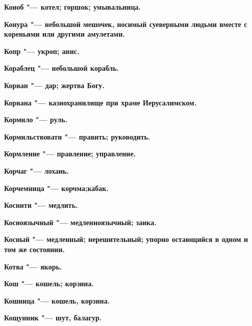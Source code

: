 \begin{multicols}{2}
\bfseries Коноб\normalfont{} "--- котел; горшок; умывальница. 




\bfseries Конура\normalfont{} "--- небольшой мешочек, носимый суеверными людьми вместе с кореньями или другими амулетами. 




\bfseries Копр\normalfont{} "--- укроп; анис. 




\bfseries Кораблец\normalfont{} "--- небольшой корабль. 




\bfseries Корван\normalfont{} "--- дар; жертва Богу. 




\bfseries Корвана\normalfont{} "--- казнохранилище при храме Иерусалимском. 




\bfseries Кормило\normalfont{} "--- руль. 




\bfseries Кормильствовати\normalfont{} "--- править; руководить. 




\bfseries Кормление\normalfont{} "--- правление; управление. 




\bfseries Корчаг\normalfont{} "--- лохань. 




\bfseries Корчемница\normalfont{} "--- корчма;кабак. 




\bfseries Коснити\normalfont{} "--- медлить. 




\bfseries Косноязычный\normalfont{} "--- медленноязычный; заика. 




\bfseries Косный\normalfont{} "--- медленный; нерешительный; упорно остающийся в одном и том же состоянии. 




\bfseries Котва\normalfont{} "--- якорь. 




\bfseries Кош\normalfont{} "--- кошель; корзина. 




\bfseries Кошница\normalfont{} "--- кошель, корзина. 




\bfseries Кощунник\normalfont{} "--- шут, балагур. 





\end{multicols}
